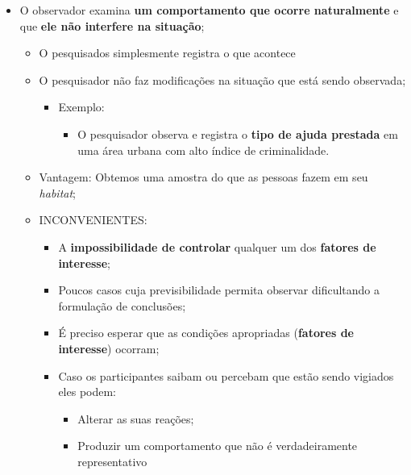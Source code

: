 \documentclass[
]{book}
\providecommand{\tightlist}{%
  \setlength{\itemsep}{0pt}\setlength{\parskip}{0pt}}
\begin{document}
\begin{itemize}
\tightlist
\item
  O observador examina \textbf{um comportamento que ocorre naturalmente} e que \textbf{ele não interfere na situação};

  \begin{itemize}
  \tightlist
  \item
    O pesquisados simplesmente registra o que acontece
  \item
    O pesquisador não faz modificações na situação que está sendo observada;

    \begin{itemize}
    \tightlist
    \item
      Exemplo:

      \begin{itemize}
      \tightlist
      \item
        O pesquisador observa e registra o \textbf{tipo de ajuda prestada} em uma área urbana com alto índice de criminalidade.
      \end{itemize}
    \end{itemize}
  \item
    Vantagem: Obtemos uma amostra do que as pessoas fazem em seu \emph{habitat};
  \item
    INCONVENIENTES:

    \begin{itemize}
    \tightlist
    \item
      A \textbf{impossibilidade de controlar} qualquer um dos \textbf{fatores de interesse};
    \item
      Poucos casos cuja previsibilidade permita observar dificultando a formulação de conclusões;
    \item
      É preciso esperar que as condições apropriadas (\textbf{fatores de interesse}) ocorram;
    \item
      Caso os participantes saibam ou percebam que estão sendo vigiados eles podem:

      \begin{itemize}
      \tightlist
      \item
        Alterar as suas reações;
      \item
        Produzir um comportamento que não é verdadeiramente representativo
      \end{itemize}
    \end{itemize}
  \end{itemize}
\end{itemize}
\end{document}
